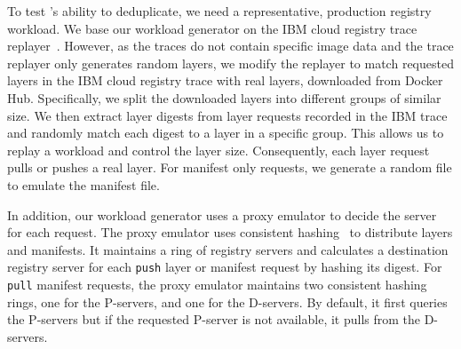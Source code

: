 To test \sysname{}'s ability to deduplicate, we need a representative, production
registry workload.
%
We base our workload generator on the IBM cloud registry trace replayer~\cite{dockerworkload}.
%
However, as the traces do not contain specific image data and the trace
replayer only generates random layers, we modify the replayer
to match requested layers in the IBM cloud registry trace with
real layers, downloaded from Docker Hub.
%
Specifically, we split the downloaded layers into different groups of similar size.
We then extract layer digests from layer requests recorded in the IBM trace
and randomly match each digest to a layer in a specific group. This allows us
to replay a workload and control the layer size.
Consequently, each layer request pulls or pushes a real layer.
%
For manifest only requests, we generate a random file to emulate the
manifest file.

In addition, our workload generator uses a proxy emulator to decide
the server for each request.
%
The proxy emulator uses
consistent hashing~\cite{kargercons} to distribute layers and manifests.
%
It maintains a ring of registry servers
and calculates a destination registry server for each \texttt{push} layer or manifest request
by hashing its digest.
%
For \texttt{pull} manifest requests, the proxy emulator maintains two consistent hashing rings,
one for the P-servers, and one for the D-servers.
%
By default, it first queries the P-servers but if the requested P-server is not available,
it pulls from the D-servers.

